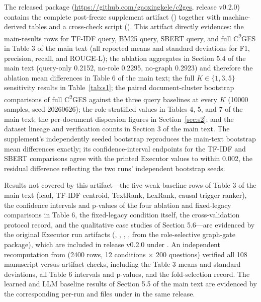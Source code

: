 \documentclass[11pt,letterpaper]{article}
\newcommand{\cges}{C\textsuperscript{2}GES}
\begin{document}
The released package (\url{https://github.com/gaoxingkele/c2ges}, release v0.2.0) contains the complete post-freeze supplement artifact () together with machine-derived tables and a cross-check script (). This artifact directly evidences: the main-results rows for TF-IDF query, BM25 query, SBERT query, and full \cges{} in Table 3 of the main text (all reported means and standard deviations for F1, precision, recall, and ROUGE-L); the ablation aggregates in Section 5.4 of the main text (query-only 0.2152, no-role 0.2295, no-graph 0.2923) and therefore the ablation mean differences in Table 6 of the main text; the full $K\in\{1,3,5\}$ sensitivity results in Table~\ref{tab:s1}; the paired document-cluster bootstrap comparisons of full \cges{} against the three query baselines at every $K$ (10000 samples, seed 20260626); the role-stratified values in Tables 4, 5, and 7 of the main text; the per-document dispersion figures in Section~\ref{sec:s2}; and the dataset lineage and verification counts in Section 3 of the main text. The supplement's independently seeded bootstrap reproduces the main-text bootstrap mean differences exactly; its confidence-interval endpoints for the TF-IDF and SBERT comparisons agree with the printed Executor values to within 0.002, the residual difference reflecting the two runs' independent bootstrap seeds.

Results not covered by this artifact---the five weak-baseline rows of Table 3 of the main text (lead, TF-IDF centroid, TextRank, LexRank, causal trigger ranker), the confidence intervals and p-values of the four ablation and fixed-legacy comparisons in Table 6, the fixed-legacy condition itself, the cross-validation protocol record, and the qualitative case studies of Section 5.6---are evidenced by the original Executor run artifacts (, , , ,  from the role-selective graph-gate package), which are included in release v0.2.0 under . An independent recomputation from  (2400 rows, 12 conditions $\times$ 200 questions) verified all 108 manuscript-versus-artifact checks, including the Table 3 means and standard deviations, all Table 6 intervals and p-values, and the  fold-selection record. The learned and LLM baseline results of Section 5.5 of the main text are evidenced by the corresponding per-run  and  files under  in the same release.
\end{document}

